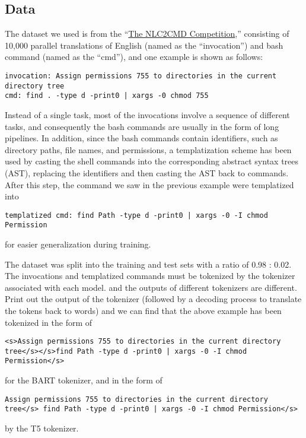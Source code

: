 \subsection{Data}
The dataset we used is from the
``\href{https://nlc2cmd.us-east.mybluemix.net/}{The NLC2CMD Competition},''
consisting of 10,000 parallel translations of English (named as the
``invocation'') and bash command (named as the ``cmd''), and one example is
shown as follows:

\begin{verbatim}
invocation: Assign permissions 755 to directories in the current directory tree
cmd: find . -type d -print0 | xargs -0 chmod 755
\end{verbatim}


Instead of a single task, most of the invocations involve a sequence of
different tasks, and consequently the bash commands are usually in the form of
long pipelines. In addition, since the bash commands contain identifiers, such
as directory paths, file names, and permissions, a templatization scheme has
been used by casting the shell commands into the corresponding abstract syntax
trees (AST), replacing the identifiers and then casting the AST back to
commands. After this step, the
command we saw in the previous example were templatized into
\begin{verbatim}
templatized cmd: find Path -type d -print0 | xargs -0 -I chmod Permission
\end{verbatim}
for easier generalization during training.

The dataset was split into the training and test sets with a ratio of 0.98 : 0.02. The invocations and templatized commands must be tokenized by the tokenizer associated with each model. and the outputs of different tokenizers are different. Print out the output of the tokenizer (followed by a decoding process to translate the tokens back to words) and we can find that the above example has been tokenized in the form of
\begin{verbatim}
<s>Assign permissions 755 to directories in the current directory 
tree</s></s>find Path -type d -print0 | xargs -0 -I chmod Permission</s>
\end{verbatim}
for the BART tokenizer, and in the form of
\begin{verbatim}
Assign permissions 755 to directories in the current directory 
tree</s> find Path -type d -print0 | xargs -0 -I chmod Permission</s>
\end{verbatim}
by the T5 tokenizer.

